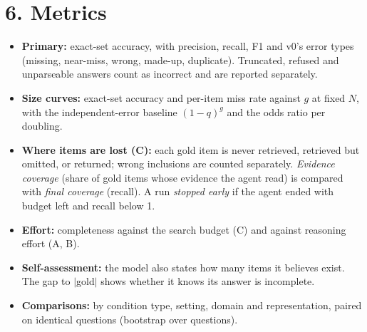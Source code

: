 \documentclass[10pt]{article}
\begin{document}
\section*{6. Metrics}
\begin{itemize}
\item \textbf{Primary:} exact-set accuracy, with precision, recall, F1 and v0's error types (missing, near-miss,
wrong, made-up, duplicate). Truncated, refused and unparseable answers count as incorrect and are reported
separately.
\item \textbf{Size curves:} exact-set accuracy and per-item miss rate against $g$ at fixed $N$, with the
independent-error baseline $(1-q)^g$ and the odds ratio per doubling.
\item \textbf{Where items are lost (C):} each gold item is never retrieved, retrieved but omitted, or returned;
wrong inclusions are counted separately. \emph{Evidence coverage} (share of gold items whose evidence the agent
read) is compared with \emph{final coverage} (recall). A run \emph{stopped early} if the agent ended with budget
left and recall below 1.
\item \textbf{Effort:} completeness against the search budget (C) and against reasoning effort (A, B).
\item \textbf{Self-assessment:} the model also states how many items it believes exist. The gap to $|$gold$|$ shows
whether it knows its answer is incomplete.
\item \textbf{Comparisons:} by condition type, setting, domain and representation, paired on identical questions
(bootstrap over questions).
\end{itemize}
\end{document}
